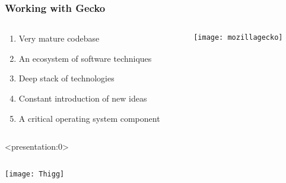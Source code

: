 \documentclass[
	notes=none,
	aspectratio=169
]{beamer}
\begin{document}
\begin{frame}
\frametitle{Working with Gecko}

\begin{columns}[T]
\begin{column}[T]{0.6\textwidth}
\setlength{\parskip}{0.5em}

\vspace{1.2cm}
\begin{enumerate}
\setlength{\parskip}{0.5em}
\item Very mature codebase
\item An ecosystem of software techniques
\item Deep stack of technologies
\item Constant introduction of new ideas
\item A critical operating system component
\end{enumerate}

\end{column}
\begin{column}[T]{0.4\textwidth}
\setlength{\parskip}{0.5em}

\vspace{0.5cm}
\texttt{[image: mozillagecko]}

\end{column}
\end{columns}

\end{frame}


\begin{frame}<presentation:0>

\begin{columns}[T]
\begin{column}[T]{1.0\textwidth}

\vspace{-0.12cm}
\hspace*{-1.1cm}
\texttt{[image: Thigg]}

\end{column}
\end{columns}

\end{frame}
\end{document}
